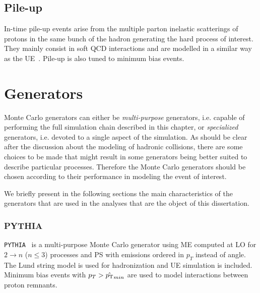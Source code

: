  


\subsection{Pile-up}\label{sec:MCpileup}

In-time pile-up events arise from the multiple parton inelastic scatterings 
of protons in the same bunch of the hadron generating the hard process
of interest. They mainly consist in soft QCD interactions and are
modelled in a similar way as the UE~\cite{Buckley:2011vq,Cacciari:2007fd}. 
Pile-up is also tuned to minimum bias events.





\section{Generators}\label{sec:generators}

Monte Carlo generators can either be {\it multi-purpose} generators,
i.e. capable of performing the full simulation chain described in this chapter,
or {\it specialized} generators, i.e. devoted to a single aspect of the
simulation. As should be clear after the discussion about the modeling
of hadronic collisions, there are some choices to be made that might result
in some generators 
being better suited 
to describe particular processes. Therefore
the Monte Carlo generators should be chosen according to their performance
in modeling the event of interest.

We briefly present in the following sections the main characteristics of the generators
that are used in the analyses that are the object of this dissertation.


\subsubsection*{PYTHIA}

\texttt{PYTHIA}~\cite{PYTHIA,Sjostrand:2007gs} is a multi-purpose Monte Carlo generator
using ME computed at LO for $2 \to n$ ($n\leq 3$) processes and PS with emissions
ordered in $p_T$ instead of angle. The Lund string model is used for hadronization
and UE simulation is included.
Minimum bias events with $p_T>\hat{\pt}_{min}$ are used to model interactions
between proton remnants.


